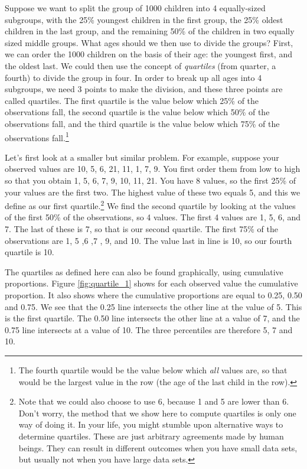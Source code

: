 Suppose we want to split the group of 1000 children into 4 equally-sized subgroups, with the 25\% youngest children in the first group, the 25\% oldest children in the last group, and the remaining 50\% of the children in two equally sized middle groups. What ages should we then use to divide the groups? First, we can order the 1000 children on the basis of their age: the youngest first, and the oldest last. We could then use the concept of \textit{quartiles} (from quarter, a fourth) to divide the group in four. In order to break up all ages into 4 subgroups, we need 3 points to make the division, and these three points are called quartiles. The first quartile is the value below which 25\% of the observations fall, the second quartile is the value below which 50\% of the observations fall, and the third quartile is the value below which 75\% of the observations fall.\footnote{The fourth quartile would be the value below which \textit{all} values are, so that would be the largest value in the row (the age of the last child in the row).}

Let's first look at a smaller but similar problem. For example, suppose your observed values are {10, 5, 6, 21, 11, 1, 7, 9}. You first order them from low to high so that you obtain {1, 5, 6, 7, 9, 10, 11, 21}. You have 8 values, so the first 25\% of your values are the first two. The highest value of these two equals 5, and this we define as our first quartile.\footnote{Note that we could also choose to use 6, because 1 and 5 are lower than 6. Don't worry, the method that we show here to compute quartiles is only one way of doing it. In your life, you might stumble upon alternative ways to determine quartiles. These are just arbitrary agreements made by human beings. They can result in different outcomes when you have small data sets, but usually not when you have large data sets.} We find the second quartile by looking at the values of the first 50\% of the observations, so 4 values. The first 4 values are 1, 5, 6, and 7. The last of these is 7, so that is our second quartile. The first 75\% of the observations are 1, 5 ,6 ,7 , 9, and 10. The value last in line is 10, so our fourth quartile is 10.

The quartiles as defined here can also be found graphically, using cumulative proportions. Figure \ref{fig:quartile_1} shows for each observed value the cumulative proportion. It also shows where the cumulative proportions are equal to 0.25, 0.50 and 0.75. We see that the 0.25 line intersects the other line at the value of 5. This is the first quartile. The 0.50 line intersects the other line at a value of 7, and the 0.75 line intersects at a value of 10. The three percentiles are therefore 5, 7 and 10.


